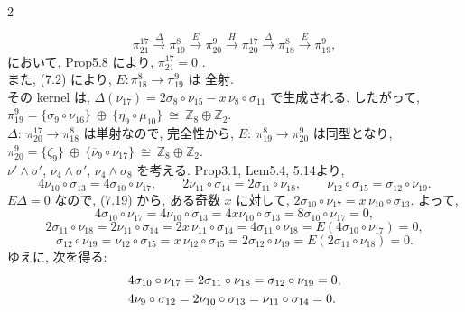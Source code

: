 \documentclass[10pt, leqno]{ltjsarticle}
\newcommand{\gen}[1]{\{#1\}}       %
\newcommand{\pit}[2]{\pi_{#1}^{#2}}
\numberwithin{equation}{section}
\theoremstyle{plain}
\theoremstyle{definition}
\theoremstyle{remark}
\begin{document}
\begin{paracol}{2}

\[
  \pit{21}{17}\xrightarrow{\ \Delta\ }
  \pit{19}{8}\xrightarrow{\ E\ }
  \pit{20}{9}\xrightarrow{\ H\ }
  \pit{20}{17}\xrightarrow{\ \Delta\ }
  \pit{18}{8}\xrightarrow{\ E\ }
  \pit{19}{9},
\]
において, Prop5.8 により, \(\pit{21}{17}=0\) . \\
また, (7.2) により, \(E:\pit{18}{8}\to\pit{19}{9}\) は 全射.\\
その kernel は,
\(
  \Delta(\nu_{17})=2\sigma_{8}\circ\nu_{15}-x\,\nu_{8}\circ\sigma_{11}
\)
で生成される. したがって,\\
\(
  \pit{19}{9}=\gen{\sigma_{9}\circ\nu_{16}}\ \oplus\ \gen{\eta_{9}\circ\mu_{10}}
  \ \cong\ \mathbb Z_{8}\oplus\mathbb Z_{2}.
\)\\
\(
\Delta:\ \pit{20}{17}\longrightarrow\pit{18}{8}
\)
は単射なので, 完全性から,
\(
  E:\ \pit{19}{8}\longrightarrow\pit{20}{9}
\)
は同型となり,\\
\(
\pit{20}{9}=\gen{\zeta_{9}}\ \oplus\ \gen{\overline{\nu}_{9}\circ\nu_{17}}
  \ \cong\ \mathbb Z_{8}\oplus\mathbb Z_{2}.
\)\\
\( \nu'\wedge \sigma'\), \( \nu_4\wedge \sigma'\), \( \nu_4\wedge \sigma_8\) を考える. 
Prop3.1,  Lem5.4, 5.14より,
\[
  4\nu_{10}\circ\sigma_{13}
  =4\sigma_{10}\circ\nu_{17}, \qquad
  2\nu_{11}\circ\sigma_{14}
  = 2\sigma_{11}\circ\nu_{18}, \qquad
  \nu_{12}\circ\sigma_{15}
  = \sigma_{12}\circ\nu_{19}.
\]
\(E\Delta = 0\) なので, (7.19) から,
ある奇数 \(x\) に対して,
\(
  2\sigma_{10}\circ\nu_{17} = x\,\nu_{10}\circ\sigma_{13}.
\)
よって,
\[
4\sigma_{10}\circ\nu_{17}
= 4\nu_{10}\circ\sigma_{13}
= 4x\nu_{10}\circ\sigma_{13}
= 8\sigma_{10}\circ\nu_{17} = 0,
\]
\[
  2\sigma_{11}\circ\nu_{18}=2\nu_{11}\circ\sigma_{14}
  =2x\,\nu_{11}\circ\sigma_{14}
  =4\sigma_{11}\circ\nu_{18}
  =E(4\sigma_{10}\circ\nu_{17})=0,
\]
\[
  \sigma_{12}\circ\nu_{19}=\nu_{12}\circ\sigma_{15}
  =x\,\nu_{12}\circ\sigma_{15}
  =2\sigma_{12}\circ\nu_{19}
  =E(2\sigma_{11}\circ\nu_{18})=0.
\]
ゆえに, 次を得る:
\begin{equation}\label{eq:7.20}
\raisetag{2ex}
\begin{aligned}[t]
  & 4\sigma_{10}\circ\nu_{17}
  =2\sigma_{11}\circ\nu_{18}
  =\sigma_{12}\circ\nu_{19}=0,\\
  & 4\nu_{9}\circ\sigma_{12}
  =2\nu_{10}\circ\sigma_{13}
  =\nu_{11}\circ\sigma_{14}=0.
\end{aligned}
\end{equation}


\end{paracol}
\end{document}
